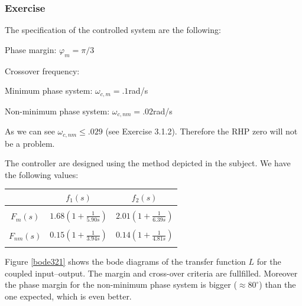 \subsubsection{Exercise}

The specification of the controlled system are the following:

\begin{shortitemize}
    \item Phase margin: $\varphi_m = \pi/3$
    \item Crossover frequency: 
        \begin{shortitemize}
            \item Minimum phase system: $\omega_{c,m} = .1$rad/s
            \item Non-minimum phase system: $\omega_{c,nm} = .02$rad/s
        \end{shortitemize}
\end{shortitemize}

As we can see $\omega_{c,nm} \leq .029$ (see Exercise 3.1.2). Therefore the RHP zero will not be a problem.

The controller are designed using the method depicted in the subject. 
We have the following values:

\begin{center}
    \begin{tabular}{|c|cc|}
        \hline
        & $f_1(s)$ & $f_2(s)$ \\
        \hline
        & & \\
        $F_{m}(s)$ &
        $ 1.68 (1 + \frac{1}{5.90s}) $ &
        $ 2.01 (1 + \frac{1}{6.39s}) $  \\ 
        & & \\
        $F_{nm}(s)$ & 
        $ 0.15 (1 + \frac{1}{3.94s}) $ &
        $ 0.14 (1 + \frac{1}{4.81s}) $ \\
        & & \\
       \hline 
    \end{tabular}
\end{center}

Figure \ref{bode321} shows the bode diagrams of the transfer function $L$ for the coupled input--output. The margin and cross-over criteria are fullfilled. Moreover the phase margin for the non-minimum phase system is bigger ($\approx 80^{\circ}$) than the one expected, which is even better.

